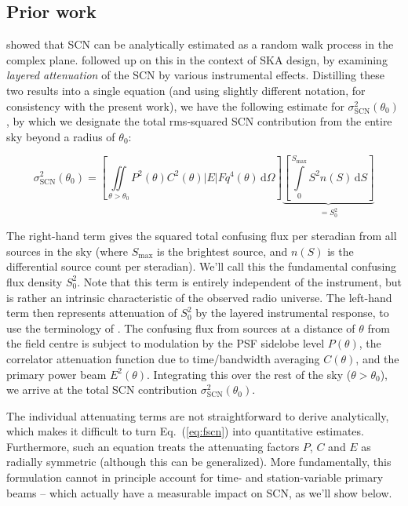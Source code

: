 \documentclass{aa}
\begin{document}
\subsection{Prior work}

\citet[][see Appendix B]{VLA146} showed that SCN can be analytically estimated as a random walk process in the complex plane. \citet[][]{SKA54-expa,SKA54} followed up on this in the context of SKA design, by examining {\em layered attenuation} of the SCN by various instrumental effects. Distilling these two results into a single equation (and using slightly different notation, for consistency with the present work), we have the following estimate for $\sigma^2_\mathrm{SCN}(\theta_0)$, by which we designate the total rms-squared SCN contribution from the entire sky beyond a radius of $\theta_0$:

\newcommand{\DD}[1]{\,\mathrm{d}{#1}}

\begin{equation}
\label{eq:fscn}
  \sigma^2_\mathrm{SCN}(\theta_0) = 
\left [ 
	\iint\limits_{\theta>\theta_0} P^2(\theta)C^2(\theta)|E|Fq^4(\theta) \DD{\Omega}
\right ] \underbrace{\left [ 
	\int\limits_{0}^{S_\mathrm{max}} S^2n(S)\DD{S} 
\right ]}_{=S^2_0}
\end{equation}

The right-hand term gives the squared total confusing flux per steradian from all sources in the sky (where $S_\mathrm{max}$ is the brightest source, and $n(S)$ is the differential source count per steradian). We'll call this the fundamental confusing flux density $S^2_0$. Note that this term is entirely independent of the instrument, but is rather an intrinsic characteristic of the observed radio universe. The left-hand term then represents attenuation of $S^2_0$ by the layered instrumental response, to use the terminology of \citet[][]{SKA54-expa,SKA54}. The confusing flux from sources at a distance of $\theta$ from the field centre is subject to modulation by the PSF sidelobe level $P(\theta)$, the correlator attenuation function due to time/bandwidth averaging $C(\theta)$, and the primary power beam $E^2(\theta)$. Integrating this over the rest of the sky ($\theta>\theta_0$), we arrive at the total SCN contribution $\sigma^2_\mathrm{SCN}(\theta_0)$. 

The individual attenuating terms are not straightforward to derive analytically, which makes it difficult to turn Eq.~(\ref{eq:fscn}) into quantitative estimates. Furthermore, such an equation treats the attenuating factors $P$, $C$ and $E$ as radially symmetric (although this can be generalized). More fundamentally, this formulation cannot in principle account for time- and station-variable primary beams -- which actually have a measurable impact on SCN, as we'll show below.
\end{document}
